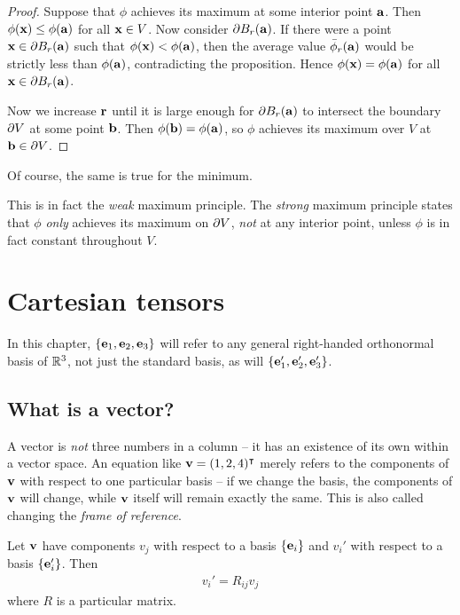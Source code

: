 \documentclass{../template/note}
\begin{document}
    \begin{proof}
        Suppose that \(\phi\) achieves its maximum at some interior point \(\V a\). Then \(\phi(\V x) \leq \phi(\V a)\) for all \(\V x \in V\). Now consider \(\pr B_r(\V a)\). If there were a point \(\V x \in \pr B_r(\V a)\) such that \(\phi(\V x) < \phi(\V a)\), then the average value \(\bar\phi_r(\V a)\) would be strictly less than \(\phi(\V a)\), contradicting the proposition. Hence \(\phi(\V x) = \phi(\V a)\) for all \(\V x \in \pr B_r(\V a)\).

        Now we increase \(\V r\) until it is large enough for \(\pr B_r(\V a)\) to intersect the boundary \(\partial V\) at some point \(\V b\). Then \(\phi(\V b) = \phi(\V a)\), so \(\phi\) achieves its maximum over \(V\) at \(\V b \in \pr V\).
    \end{proof}
    
    Of course, the same is true for the minimum.

    \begin{remark*}
        This is in fact the \emph{weak} maximum principle. The \emph{strong} maximum principle states that \(\phi\) \emph{only} achieves its maximum on \(\partial V\), \emph{not} at any interior point, unless \(\phi\) is in fact constant throughout \(V\).
    \end{remark*}
    
    \section{Cartesian tensors}

    In this chapter, \(\{\V e_1, \V e_2, \V e_3\}\) will refer to any general right-handed orthonormal basis of \(\mathbb R^3\), not just the standard basis, as will \(\{\V e_1', \V e_2', \V e_3'\}\).

    \subsection{What is a vector?}

    A vector is \emph{not} three numbers in a column -- it has an existence of its own within a vector space. An equation like \(\V v = (1, 2, 4)^\intercal\) merely refers to the components of \(\V v\) with respect to one particular basis -- if we change the basis, the components of \(\V v\) will change, while \(\V v\) itself will remain exactly the same. This is also called changing the \emph{frame of reference}.

    \begin{proposition}
        \label{transformation-rule}
        Let \(\V v\) have components \(v_j\) with respect to a basis \(\{\V e_i\}\) and \(v_i'\) with respect to a basis \(\{\V e_i'\}\). Then
        \begin{align*}
            v_i' = R_{ij} v_j
        \end{align*}
        where \(R\) is a particular matrix.
    \end{proposition}
\end{document}
